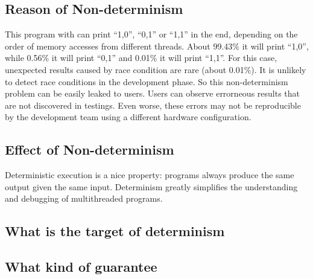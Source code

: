 \subsection{Reason of Non-determinism}

\label{sec:nondeterminism}
This program with \pthreads{} can print ``1,0'', ``0,1'' or ``1,1'' in the end, 
depending on the order of memory accesses from different threads. 
About 99.43\% it will print ``1,0'', while 0.56\% it will print ``0,1''
and 0.01\% it will print ``1,1''.
For this case, unexpected results caused by race condition are rare (about 0.01\%). 
It is unlikely to detect race conditions in the development phase. 
So this non-determinism problem can be easily leaked to users.
Users can observe errorneous results that are not discovered in testings. 
Even worse, these errors may not be reproducible by the development team using
a different hardware configuration. 

\subsection{Effect of Non-determinism}

Deterministic execution is a nice property: programs always produce 
the same output given the same input.
Determinism greatly simplifies the understanding and debugging of multithreaded programs.

\subsection{What is the target of determinism}
\subsection{What kind of guarantee}
